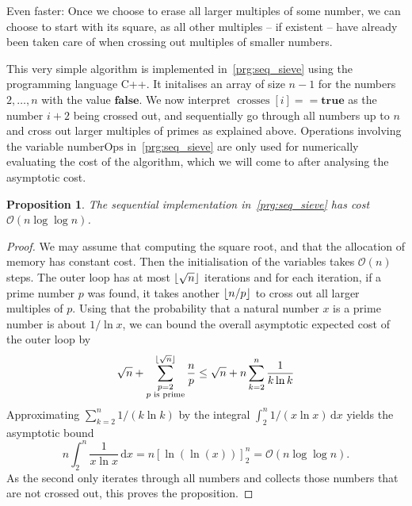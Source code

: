 \documentclass[a4paper,12pt]{article}
\newtheorem{proposition}{Proposition}
\DeclarePairedDelimiter\floor{\lfloor}{\rfloor}
\newcommand{\bigO}{\mathcal{O}}
\DeclareMathOperator{\crosses}{crosses}
\begin{document}
Even faster: Once we choose to erase all larger multiples of some number, we can choose to start with its square, as all other multiples -- if existent -- have already been taken care of when crossing out multiples of smaller numbers.

This very simple algorithm is implemented in~\autoref{prg:seq_sieve} using the programming language C++.
It initalises an array of size $n-1$ for the numbers $2,\dots, n$ with the value $\mathbf{false}$.
We now interpret $\crosses[i] == \mathbf{true}$ as the number $i+2$ being crossed out, and sequentially go through all numbers up to $n$ and cross out larger multiples of primes as explained above.
Operations involving the variable $\mathrm{numberOps}$ in~\autoref{prg:seq_sieve} are only used for numerically evaluating the cost of the algorithm, which we will come to after analysing the asymptotic cost.

\begin{proposition}\label{prop:seq_sieve}
	The sequential implementation in~\autoref{prg:seq_sieve} has cost $\bigO(n \log \log n)$.
\end{proposition}
\begin{proof}
	We may assume that computing the square root, and that the allocation of memory has constant cost.
	Then the initialisation of the variables takes $\bigO(n)$ steps.
	The outer loop has at most $\floor{\sqrt{n}}$ iterations and for each iteration, if a prime number $p$ was found, it takes another $\floor{n / p}$ to cross out all larger multiples of $p$.
	Using that the probability that a natural number $x$ is a prime number is about $1/\ln x$, we can bound the overall asymptotic expected cost of the outer loop by
	\[
		\sqrt n + \sum_{\substack{p = 2 \\ \text{$p$ is prime}}}^{\floor{\sqrt{n}}} \frac{n}{p} \leq \sqrt{n} + n \sum_{k = 2}^n \frac{1}{k \ln k}
	\]
	Approximating $\sum_{k=2}^n 1/(k\ln k)$ by the integral $\int_2^n 1 / (x \ln x) \,\mathrm{d}x$ yields the asymptotic bound
	\[
		n \int_2^n \frac{1}{x \ln x}\, \mathrm{d}x = n \left[ \ln(\ln(x)) \right]_2^n = \bigO(n\log\log n ).
	\]
	As the second only iterates through all numbers and collects those numbers that are not crossed out, this proves the proposition.
\end{proof}
\end{document}
